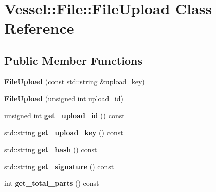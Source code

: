 \hypertarget{class_vessel_1_1_file_1_1_file_upload}{}\section{Vessel\+:\+:File\+:\+:File\+Upload Class Reference}
\label{class_vessel_1_1_file_1_1_file_upload}
\subsection*{Public Member Functions}
\begin{DoxyCompactItemize}
\item 
\mbox{\label{class_vessel_1_1_file_1_1_file_upload_ae4cf17d031fc2ef3c40ef7169181f8f3}} 
{\bfseries File\+Upload} (const std\+::string \&upload\+\_\+key)
\item 
\mbox{\label{class_vessel_1_1_file_1_1_file_upload_a2356608e1bf014feba93dba394f4e9ee}} 
{\bfseries File\+Upload} (unsigned int upload\+\_\+id)
\item 
\mbox{\label{class_vessel_1_1_file_1_1_file_upload_a2b6613dbefe6cef42e7a90d85ff42be6}} 
unsigned int {\bfseries get\+\_\+upload\+\_\+id} () const
\item 
\mbox{\label{class_vessel_1_1_file_1_1_file_upload_afcffcd79f065514b1306da4e3ccdae0c}} 
std\+::string {\bfseries get\+\_\+upload\+\_\+key} () const
\item 
\mbox{\label{class_vessel_1_1_file_1_1_file_upload_a1aea0a2c881b55dc6800d7e2a61cb6dd}} 
std\+::string {\bfseries get\+\_\+hash} () const
\item 
\mbox{\label{class_vessel_1_1_file_1_1_file_upload_a7368ab66aa36b85d6e8b1c5dc6c89b16}} 
std\+::string {\bfseries get\+\_\+signature} () const
\item 
\mbox{\label{class_vessel_1_1_file_1_1_file_upload_ae5a9c73d0a1cfe50c11889f6390c53ca}} 
int {\bfseries get\+\_\+total\+\_\+parts} () const
\item 

\end{DoxyCompactItemize}
